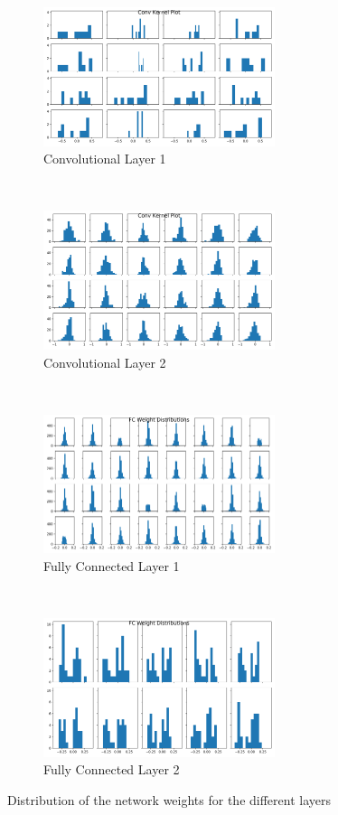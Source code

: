 \begin{figure}[htbp]
    \centering
    \begin{subfigure}[t]{0.5\textwidth}
        \centering
        \includegraphics[height=1.6in]{../../net/images/hist_cn1_k}
        \caption{Convolutional Layer 1}
    \end{subfigure}%
    ~ 
    \begin{subfigure}[t]{0.5\textwidth}
        \centering
         \includegraphics[height=1.6in]{../../net/images/hist_cn2_k}
        \caption{Convolutional Layer 2}
    \end{subfigure}%
    \\
    \begin{subfigure}[t]{0.5\textwidth}
        \centering
        \includegraphics[height=1.6in]{../../net/images/hist_fc1_w}
        \caption{Fully Connected Layer 1}
    \end{subfigure}%
    ~ 
    \begin{subfigure}[t]{0.5\textwidth}
        \centering
         \includegraphics[height=1.6in]{../../net/images/hist_fc2_w}
        \caption{Fully Connected Layer 2}
    \end{subfigure}
    \caption{Distribution of the network weights for the different layers}
    \label{fig:network-weight-distributions}
\end{figure}



